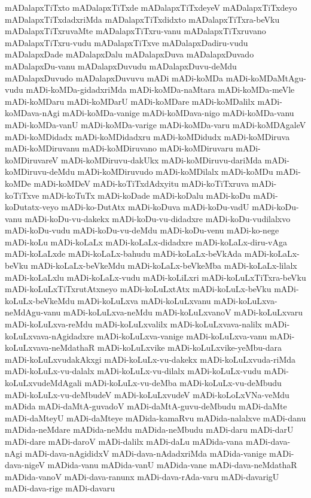 {mADalapxTiTxto
mADalapxTiTxde
mADalapxTiTxdeyeV
mADalapxTiTxdeyo
mADalapxTiTxdadxriMda
mADalapxTiTxdidxto
mADalapxTiTxra-beVku
mADalapxTiTxruvaMte
mADalapxTiTxru-vanu
mADalapxTiTxruvano
mADalapxTiTxru-vudu
mADalapxTiTxve
mADalapxDadiru-vudu
mADalapxDade
mADalapxDalu
mADalapxDuva
mADalapxDuvado
mADalapxDu-vanu
mADalapxDuvudu
mADalapxDuvu-deMdu
mADalapxDuvudo
mADalapxDuvuvu
mADi
mADi-koMDa
mADi-koMDaMtAgu-vudu
mADi-koMDa-gidadxriMda
mADi-koMDa-naMtara
mADi-koMDa-meVle
mADi-koMDaru
mADi-koMDarU
mADi-koMDare
mADi-koMDalilx
mADi-koMDava-nAgi
mADi-koMDa-vanige
mADi-koMDava-nigo
mADi-koMDa-vanu
mADi-koMDa-vanU
mADi-koMDa-varige
mADi-koMDa-varu
mADi-koMDAgaleV
mADi-koMDidadx
mADi-koMDidadxru
mADi-koMDidudx
mADi-koMDiruva
mADi-koMDiruvanu
mADi-koMDiruvano
mADi-koMDiruvaru
mADi-koMDiruvareV
mADi-koMDiruvu-dakUkx
mADi-koMDiruvu-dariMda
mADi-koMDiruvu-deMdu
mADi-koMDiruvudo
mADi-koMDilalx
mADi-koMDu
mADi-koMDe
mADi-koMDeV
mADi-koTiTxdAdxyitu
mADi-koTiTxruva
mADi-koTiTxve
mADi-koTuTx
mADi-koDade
mADi-koDalu
mADi-koDu
mADi-koDutatx-veyo
mADi-ko-DutAtx
mADi-koDuva
mADi-koDu-vadU
mADi-koDu-vanu
mADi-koDu-vu-dakekx
mADi-koDu-vu-didadxre
mADi-koDu-vudilalxvo
mADi-koDu-vudu
mADi-koDu-vu-deMdu
mADi-koDu-venu
mADi-ko-nege
mADi-koLu
mADi-koLaLx
mADi-koLaLx-didadxre
mADi-koLaLx-diru-vAga
mADi-koLaLxde
mADi-koLaLx-bahudu
mADi-koLaLx-beVkAda
mADi-koLaLx-beVku
mADi-koLaLx-beVkeMdu
mADi-koLaLx-beVkeMba
mADi-koLaLx-lilalx
mADi-koLaLxlu
mADi-koLaLx-vudu
mADi-koLiLxri
mADi-koLuLxTiTxra-beVku
mADi-koLuLxTiTxrutAtxneyo
mADi-koLuLxtAtx
mADi-koLuLx-beVku
mADi-koLuLx-beVkeMdu
mADi-koLuLxva
mADi-koLuLxvanu
mADi-koLuLxva-neMdAgu-vanu
mADi-koLuLxva-neMdu
mADi-koLuLxvanoV
mADi-koLuLxvaru
mADi-koLuLxva-reMdu
mADi-koLuLxvalilx
mADi-koLuLxvava-nalilx
mADi-koLuLxvava-nAgidadxre
mADi-koLuLxva-vanige
mADi-koLuLxva-vanu
mADi-koLuLxvava-neMdathaR
mADi-koLuLxvike
mADi-koLuLxvike-yeMbu-dara
mADi-koLuLxvudakAkxgi
mADi-koLuLx-vu-dakekx
mADi-koLuLxvuda-riMda
mADi-koLuLx-vu-dalalx
mADi-koLuLx-vu-dilalx
mADi-koLuLx-vudu
mADi-koLuLxvudeMdAgali
mADi-koLuLx-vu-deMba
mADi-koLuLx-vu-deMbudu
mADi-koLuLx-vu-deMbudeV
mADi-koLuLxvudeV
mADi-koLoLxVNa-veMdu
mADida
mADi-daMtA-guvadoV
mADi-daMtA-guvu-deMbudu
mADi-daMte
mADi-daMteyU
mADi-daMteye
mADida-kamaRvu
mADida-nalalxve
mADi-danu
mADida-neMdare
mADida-neMdu
mADida-neMbudu
mADi-daru
mADi-darU
mADi-dare
mADi-daroV
mADi-dalilx
mADi-daLu
mADida-vana
mADi-dava-nAgi
mADi-dava-nAgididxV
mADi-dava-nAdadxriMda
mADida-vanige
mADi-dava-nigeV
mADida-vanu
mADida-vanU
mADida-vane
mADi-dava-neMdathaR
mADida-vanoV
mADi-dava-ranunx
mADi-dava-rAda-varu
mADi-davarigU
mADi-dava-rige
mADi-davaru
}
